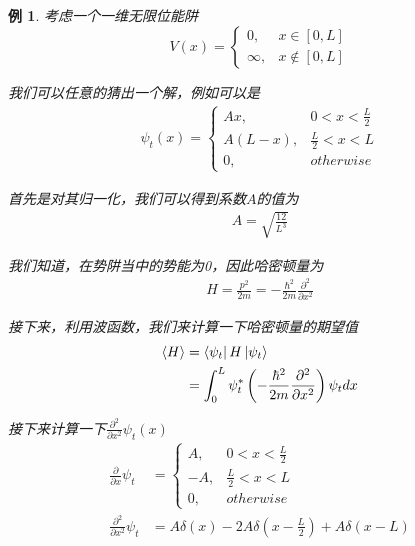 \documentclass{article}
\newtheorem{example}{例}
\newcommand{\expectation}[1]{\langle #1 \rangle}
\begin{document}
\begin{example}
	考虑一个一维无限位能阱
	\[
		V(x)=
		\begin{cases}
			0,      & x\in[0,L]    \\
			\infty, & x\notin[0,L]
		\end{cases}
	\]

	我们可以任意的猜出一个解，例如可以是
	\begin{align*}
		\psi_t(x)=
		\begin{cases}
			Ax,     & 0<x<\frac{L}{2} \\
			A(L-x), & \frac{L}{2}<x<L \\
			0,      & otherwise
		\end{cases}
	\end{align*}

	首先是对其归一化，我们可以得到系数$A$的值为
	\begin{align*}
		A=\sqrt{\frac{12}{L^3}}
	\end{align*}

	我们知道，在势阱当中的势能为0，因此哈密顿量为
	\begin{align*}
		H=\frac{p^2}{2m}=-\frac{\hbar^2}{2m}\frac{\partial^2}{\partial x^2}
	\end{align*}

	接下来，利用波函数，我们来计算一下哈密顿量的期望值
	\begin{align*}
		\expectation{H} & =\bra{\psi_t}H\ket{\psi_t}                                                                   \\
		                & =\int_{0}^{L}\psi^*_t\left(-\frac{\hbar^2}{2m}\frac{\partial^2}{\partial x^2}\right)\psi_tdx \\
	\end{align*}

	接下来计算一下$\displaystyle \frac{\partial^2}{\partial x^2}\psi_t(x)$
	\begin{align*}
		\frac{\partial}{\partial x}\psi_t     & =
		\begin{cases}
			A,  & 0<x<\frac{L}{2} \\
			-A, & \frac{L}{2}<x<L \\
			0,  & otherwise
		\end{cases}                                                                    \\
		\frac{\partial^2}{\partial x^2}\psi_t & =A\delta(x)-2A\delta(x-\frac{L}{2})+A\delta(x-L)
	\end{align*}


\end{example}
\end{document}
